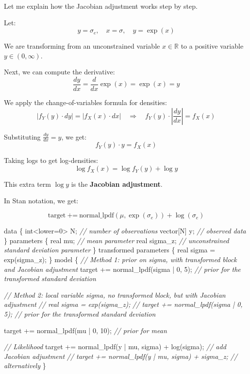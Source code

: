 \documentclass[
  letterpaper,
  DIV=11,
  numbers=noendperiod]{scrartcl}
\newenvironment{Shaded}{}{}
\newcommand{\CommentTok}[1]{\textcolor[rgb]{0.63,0.63,0.65}{\textit{#1}}}
\newcommand{\DataTypeTok}[1]{\textcolor[rgb]{0.65,0.15,0.64}{#1}}
\newcommand{\DecValTok}[1]{\textcolor[rgb]{0.60,0.41,0.00}{#1}}
\newcommand{\KeywordTok}[1]{\textcolor[rgb]{0.65,0.15,0.64}{#1}}
\newcommand{\NormalTok}[1]{\textcolor[rgb]{0.22,0.23,0.26}{#1}}
\begin{document}
\begin{note}
Let me explain how the Jacobian adjustment works step by step.

Let:
$$
y = \sigma_e, \quad x = \sigma, \quad y = \exp(x)
$$

We are transforming from an unconstrained variable $ x \in \mathbb{R} $ to a positive variable $ y \in (0, \infty) $.

Next, we can compute the derivative:
$$
\frac{dy}{dx} = \frac{d}{dx} \exp(x) = \exp(x) = y
$$

We apply the change-of-variables formula for densities:
$$
\left|f_Y(y) \cdot dy\right| = \left|f_X(x) \cdot dx\right| 
\quad \Rightarrow \quad 
f_Y(y) \cdot \left| \frac{dy}{dx} \right| = f_X(x)
$$

Substituting $ \frac{dy}{dx} = y $, we get:
$$
f_Y(y) \cdot y = f_X(x)
$$

Taking logs to get log-densities:
$$
\log f_X(x) = \log f_Y(y) + \log y
$$

This extra term $ \log y $ is the \textbf{Jacobian adjustment}.

In Stan notation, we get:

$$
\text{target} ~ \text{+=} ~ \text{normal\_lpdf}(\mu, \exp(\sigma_e)) + \log(\sigma_e)
$$
\end{note}

\begin{Shaded}
\begin{Highlighting}[]
\KeywordTok{data}\NormalTok{ \{}
  \DataTypeTok{int}\NormalTok{\textless{}}\KeywordTok{lower}\NormalTok{=}\DecValTok{0}\NormalTok{\textgreater{} N; }\CommentTok{// number of observations}
  \DataTypeTok{vector}\NormalTok{[N] y; }\CommentTok{// observed data}
\NormalTok{\}}
\KeywordTok{parameters}\NormalTok{ \{}
  \DataTypeTok{real}\NormalTok{ mu; }\CommentTok{// mean parameter}
  \DataTypeTok{real}\NormalTok{ sigma\_z; }\CommentTok{// unconstrained standard deviation parameter}
\NormalTok{\}}
\KeywordTok{transformed parameters}\NormalTok{ \{}
  \DataTypeTok{real}\NormalTok{ sigma = exp(sigma\_z);}
\NormalTok{\}}
\KeywordTok{model}\NormalTok{ \{}
  \CommentTok{// Method 1: prior on sigma, with transformed block and Jacobian adjustment}
  \KeywordTok{target +=}\NormalTok{ normal\_lpdf(sigma | }\DecValTok{0}\NormalTok{, }\DecValTok{5}\NormalTok{); }\CommentTok{// prior for the transformed standard deviation}

  \CommentTok{// Method 2: local variable sigma, no transformed block, but with Jacobian adjustment}
  \CommentTok{// real sigma = exp(sigma\_z);}
  \CommentTok{// target += normal\_lpdf(sigma | 0, 5); // prior for the transformed standard deviation}

  \KeywordTok{target +=}\NormalTok{ normal\_lpdf(mu | }\DecValTok{0}\NormalTok{, }\DecValTok{10}\NormalTok{); }\CommentTok{// prior for mean}
  
  \CommentTok{// Likelihood}
  \KeywordTok{target +=}\NormalTok{ normal\_lpdf(y | mu, sigma) + log(sigma); }\CommentTok{// add Jacobian adjustment}
  \CommentTok{// target += normal\_lpdf(y | mu, sigma) + sigma\_z; // alternatively}
\NormalTok{\}}

\end{Highlighting}
\end{Shaded}
\end{document}
